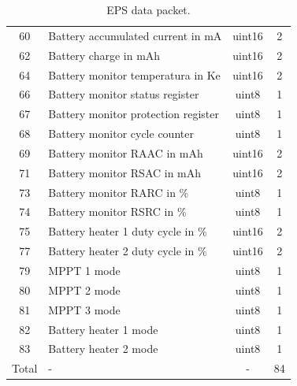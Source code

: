 \begin{table}[!ht]
\begin{tabular}{clcc}
		60                  & Battery accumulated current in mA                 & uint16             & 2                     \\   
		62                  & Battery charge in mAh                             & uint16             & 2                     \\   
		64                  & Battery monitor temperatura in Ke                 & uint16             & 2                     \\   
		66                  & Battery monitor status register                   & uint8              & 1                     \\   
		67                  & Battery monitor protection register               & uint8              & 1                     \\   
		68                  & Battery monitor cycle counter                     & uint8              & 1                     \\   
		69                  & Battery monitor RAAC in mAh                       & uint16             & 2                     \\   
		71                  & Battery monitor RSAC in mAh                       & uint16             & 2                     \\   
		73                  & Battery monitor RARC in \%                        & uint8              & 1                     \\   
		74                  & Battery monitor RSRC in \%                        & uint8              & 1                     \\   
		75                  & Battery heater 1 duty cycle in \%                 & uint16             & 2                     \\   
		77                  & Battery heater 2 duty cycle in \%                 & uint16             & 2                     \\   
		79                  & MPPT 1 mode                                       & uint8              & 1                     \\   
		80                  & MPPT 2 mode                                       & uint8              & 1                     \\   
		81                  & MPPT 3 mode                                       & uint8              & 1                     \\   
		82                  & Battery heater 1 mode                             & uint8              & 1                     \\   
		83                  & Battery heater 2 mode                             & uint8              & 1                     \\   
		\midrule                                                                                                    
        Total               & -                                                 & -                  & 84                    \\
		\bottomrule[1.5pt]
	\end{tabular}
	\caption{EPS data packet.}
	\label{tab:telemetry-eps}
\end{table}

